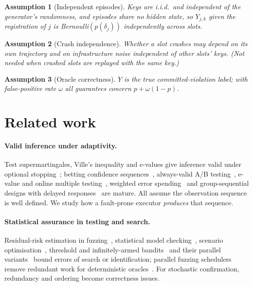 \documentclass[11pt]{article}
\newtheorem{assumption}{Assumption}
\theoremstyle{definition}
\begin{document}
\begin{assumption}[Independent episodes]\label{as:a1} Keys are i.i.d.\ and independent of the generator's randomness, and episodes share no hidden state, so $Y_{j,k}$ given the registration of $j$ is Bernoulli$(p(\delta_j))$ independently across slots.\end{assumption}
\begin{assumption}[Crash independence]\label{as:a2} Whether a slot crashes may depend on its own trajectory and on infrastructure noise independent of other slots' keys. (Not needed when crashed slots are replayed with the same key.)\end{assumption}
\begin{assumption}[Oracle correctness]\label{as:a3} $Y$ is the true committed-violation label; with false-positive rate $\omega$ all guarantees concern $p+\omega(1-p)$.\end{assumption}

\section{Related work}\label{sec:related}

\paragraph{Valid inference under adaptivity.} Test supermartingales, Ville's inequality and e-values give inference valid under optional stopping~\cite{ramdas2023savi,vovk2021,grunwald2024safe}; betting confidence sequences~\cite{waudbysmith2024,howard2021}, always-valid A/B testing~\cite{johari2022}, e-value and online multiple testing~\cite{wang2022ebh,xu2024online,foster2008}, weighted error spending~\cite{genovese2006} and group-sequential designs with delayed responses~\cite{hampson2013} are mature. All assume the observation sequence is well defined. We study how a fault-prone executor \emph{produces} that sequence.

\paragraph{Statistical assurance in testing and search.} Residual-risk estimation in fuzzing~\cite{bohme2018stads,bohme2021residual}, statistical model checking~\cite{younes2006,legay2010}, scenario optimisation~\cite{campi2008}, threshold and infinitely-armed bandits~\cite{kano2019,locatelli2016,aziz2018,chaudhuri2017} and their parallel variants~\cite{hillel2013,li2020asha} bound errors of search or identification; parallel fuzzing schedulers remove redundant work for deterministic oracles~\cite{dynamiq2025}. For stochastic confirmation, redundancy and ordering become correctness issues.
\end{document}
